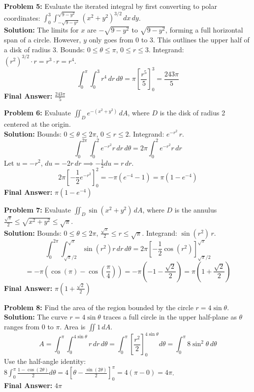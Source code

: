 \documentclass[11pt]{article}
\begin{document}
\vspace{0.5cm}
\textbf{Problem 5:} Evaluate the iterated integral by first converting to polar coordinates: $\int_0^3 \int_{-\sqrt{9-y^2}}^{\sqrt{9-y^2}} (x^2+y^2)^{3/2} \, dx \, dy$.
\\
\textbf{Solution:}
The limits for $x$ are $-\sqrt{9-y^2}$ to $\sqrt{9-y^2}$, forming a full horizontal span of a circle. However, $y$ only goes from 0 to 3. This outlines the upper half of a disk of radius 3.
Bounds: $0 \le \theta \le \pi$, $0 \le r \le 3$. 
Integrand: $(r^2)^{3/2} \cdot r = r^3 \cdot r = r^4$.
$$ \int_0^\pi \int_0^3 r^4 \, dr \, d\theta = \pi \left[ \frac{r^5}{5} \right]_0^3 = \frac{243\pi}{5} $$
\textbf{Final Answer:} $\frac{243\pi}{5}$

\vspace{0.5cm}
\textbf{Problem 6:} Evaluate $\iint_D e^{-(x^2+y^2)} \, dA$, where $D$ is the disk of radius 2 centered at the origin.
\\
\textbf{Solution:}
Bounds: $0 \le \theta \le 2\pi$, $0 \le r \le 2$.
Integrand: $e^{-r^2} \, r$.
$$ \int_0^{2\pi} \int_0^2 e^{-r^2} r \, dr \, d\theta = 2\pi \int_0^2 e^{-r^2} r \, dr $$
Let $u = -r^2$, $du = -2r \, dr \implies -\frac{1}{2}du = r \, dr$.
$$ 2\pi \left[ -\frac{1}{2} e^{-r^2} \right]_0^2 = -\pi (e^{-4} - 1) = \pi(1 - e^{-4}) $$
\textbf{Final Answer:} $\pi(1 - e^{-4})$

\vspace{0.5cm}
\textbf{Problem 7:} Evaluate $\iint_D \sin(x^2+y^2) \, dA$, where $D$ is the annulus $\frac{\sqrt{\pi}}{2} \le \sqrt{x^2+y^2} \le \sqrt{\pi}$.
\\
\textbf{Solution:}
Bounds: $0 \le \theta \le 2\pi$, $\frac{\sqrt{\pi}}{2} \le r \le \sqrt{\pi}$.
Integrand: $\sin(r^2) \, r$.
$$ \int_0^{2\pi} \int_{\sqrt{\pi}/2}^{\sqrt{\pi}} \sin(r^2) r \, dr \, d\theta = 2\pi \left[ -\frac{1}{2} \cos(r^2) \right]_{\sqrt{\pi}/2}^{\sqrt{\pi}} $$
$$ = -\pi \left( \cos(\pi) - \cos\left(\frac{\pi}{4}\right) \right) = -\pi \left( -1 - \frac{\sqrt{2}}{2} \right) = \pi \left( 1 + \frac{\sqrt{2}}{2} \right) $$
\textbf{Final Answer:} $\pi \left( 1 + \frac{\sqrt{2}}{2} \right)$

\vspace{0.5cm}
\textbf{Problem 8:} Find the area of the region bounded by the circle $r = 4\sin\theta$.
\\
\textbf{Solution:}
The curve $r = 4\sin\theta$ traces a full circle in the upper half-plane as $\theta$ ranges from $0$ to $\pi$. Area is $\iint 1 \, dA$.
$$ A = \int_0^\pi \int_0^{4\sin\theta} r \, dr \, d\theta = \int_0^\pi \left[ \frac{r^2}{2} \right]_0^{4\sin\theta} d\theta = \int_0^\pi 8\sin^2\theta \, d\theta $$
Use the half-angle identity: $8 \int_0^\pi \frac{1-\cos(2\theta)}{2} d\theta = 4 \left[ \theta - \frac{\sin(2\theta)}{2} \right]_0^\pi = 4(\pi - 0) = 4\pi $.
\\
\textbf{Final Answer:} $4\pi$
\end{document}
